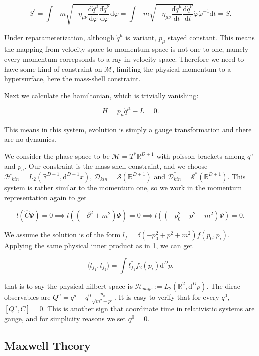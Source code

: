 \documentclass{article}
\begin{document}
$$
S^\prime = \int -m\sqrt{-\eta_{\mu\nu}\frac{\mathrm{d}\dot{q}^\mu}{\mathrm{d}\varphi}\frac{\mathrm{d}\dot{q}^\nu}{\mathrm{d}\varphi}}\mathrm{d}\varphi = \int -m\sqrt{-\eta_{\mu\nu}\frac{\mathrm{d}\dot{q}^\mu}{\mathrm{d}t}\frac{\mathrm{d}\dot{q}^\nu}{\mathrm{d}t}}\dot{\varphi}\dot{\varphi}^{-1}\mathrm{d}t = S.
$$

Under reparameterization, although $\dot{q}^\mu$ is variant, $p_\mu$ stayed constant. This means the mapping from velocity space to momentum space is not one-to-one, namely every momentum correpsonds to a ray in velocity space. Therefore we need to have some kind of constraint on $\mathcal{M}$, limiting the physical momentum to a hypersurface, here the mass-shell constraint.

Next we calculate the hamiltonian, which is trivially vanishing:

$$
H = p_\mu \dot{q}^\mu - L = 0.
$$

This means in this system, evolution is simply a gauge transformation and there are no dynamics.

We consider the phase space to be $\mathcal{M} = T^\ast \mathbb{R}^{D+1}$ with poisson brackets among $q^a$ and $p_a$. Our constraint is the mass-shell constraint, and we choose $\mathcal{H}_{kin} = L_2(\mathbb{R}^{D+1}, \mathrm{d}^{D+1}x)$, $\mathcal{D}_{kin} = \mathcal{S}(\mathbb{R}^{D+1})$ and $\mathcal{D}^\ast_{kin} = \mathcal{S}^\ast(\mathbb{R}^{D+1})$. This system is rather similar to the momentum one, so we work in the momentum representation again to get

$$
l(\hat{C}\Psi) = 0 \implies l((-\partial^2 + m^2)\Psi) = 0 \implies l((-p_0^2 + p^2 + m^2)\Psi) = 0.
$$

We assume the solution is of the form $l_f = \delta(-p_0^2 + p^2 + m^2)f(p_0,p_i)$. Applying the same physical inner product as in 1, we can get

$$
\langle l_{f_1}, l_{f_2}\rangle = \int l^\ast_{f_1}f_2(p_i)\mathrm{d}^Dp.
$$

that is to say the physical hilbert space is $\mathcal{H}_{phys} := L_2(\mathbb{R}^2,\mathrm{d}^Dp)$. The dirac observables are $Q^a = q^a - q^0\frac{p_a}{\sqrt{m^2+p^2}}$. It is easy to verify that for every $q^0$, $[Q^a,C] = 0$. This is another sign that coordinate time in relativistic systems are gauge, and for simplicity reasons we set $q^0 = 0$.

\hrulefill

\subsection{Maxwell Theory}
\end{document}
